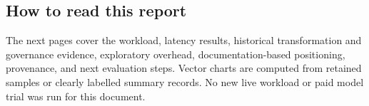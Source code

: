 \subsection*{How to read this report}
The next pages cover the workload, latency results, historical transformation and governance evidence, exploratory overhead, documentation-based positioning, provenance, and next evaluation steps. Vector charts are computed from retained samples or clearly labelled summary records. No new live workload or paid model trial was run for this document.

